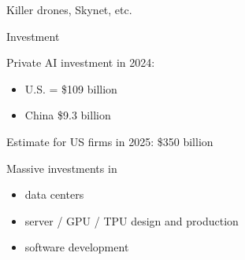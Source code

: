 \begin{frame}{Killer drones, Skynet, etc.}

    \begin{figure}
       \centering
    \end{figure}

\end{frame}

\begin{frame}{Investment}

    Private AI investment in 2024:

    \begin{itemize}
        \item U.S. = \$109 billion 
        \vspace{0.5em}
        \item China \$9.3 billion 
    \end{itemize}

        \vspace{0.5em}
    Estimate for US firms in 2025: \$350 billion

        \vspace{0.5em}
    Massive investments in 

    \begin{itemize}
        \item data centers
        \vspace{0.5em}
        \item server / GPU / TPU design and production
        \vspace{0.5em}
        \item software development
    \end{itemize}

\end{frame}



